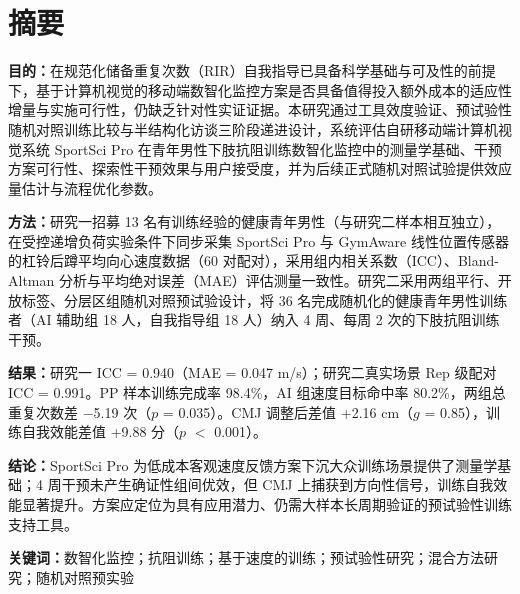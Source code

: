
\chapter*{摘要}

\textbf{目的：}在规范化储备重复次数（RIR）自我指导已具备科学基础与可及性的前提下，基于计算机视觉的移动端数智化监控方案是否具备值得投入额外成本的适应性增量与实施可行性，仍缺乏针对性实证证据。本研究通过工具效度验证、预试验性随机对照训练比较与半结构化访谈三阶段递进设计，系统评估自研移动端计算机视觉系统 SportSci Pro 在青年男性下肢抗阻训练数智化监控中的测量学基础、干预方案可行性、探索性干预效果与用户接受度，并为后续正式随机对照试验提供效应量估计与流程优化参数。

\textbf{方法：}研究一招募 13 名有训练经验的健康青年男性（与研究二样本相互独立），在受控递增负荷实验条件下同步采集 SportSci Pro 与 GymAware 线性位置传感器的杠铃后蹲平均向心速度数据（60 对配对），采用组内相关系数（ICC）、Bland-Altman 分析与平均绝对误差（MAE）评估测量一致性。研究二采用两组平行、开放标签、分层区组随机对照预试验设计，将 36 名完成随机化的健康青年男性训练者（AI 辅助组 18 人，自我指导组 18 人）纳入 4 周、每周 2 次的下肢抗阻训练干预。

\textbf{结果：}研究一 ICC = 0.940（MAE = 0.047 m/s）；研究二真实场景 Rep 级配对 ICC = 0.991。PP 样本训练完成率 98.4\%，AI 组速度目标命中率 80.2\%，两组总重复次数差 $-$5.19 次（$p$ = 0.035）。CMJ 调整后差值 +2.16 cm（$g$ = 0.85），训练自我效能差值 +9.88 分（$p$ $<$ 0.001）。

\textbf{结论：}SportSci Pro 为低成本客观速度反馈方案下沉大众训练场景提供了测量学基础；4 周干预未产生确证性组间优效，但 CMJ 上捕获到方向性信号，训练自我效能显著提升。方案应定位为具有应用潜力、仍需大样本长周期验证的预试验性训练支持工具。

\textbf{关键词：}数智化监控；抗阻训练；基于速度的训练；预试验性研究；混合方法研究；随机对照预实验
